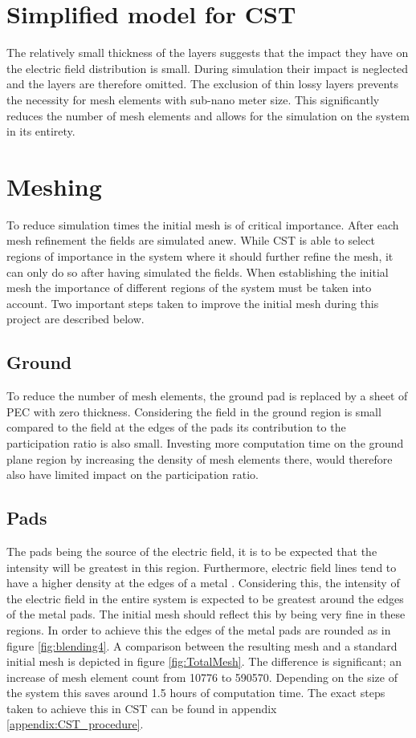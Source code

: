 \section{Simplified model for CST}
The relatively small thickness of the layers suggests that the impact they have on the electric field distribution is small. During simulation their impact is neglected and the layers are therefore omitted. %
The exclusion of thin lossy layers prevents the necessity for mesh elements with sub-nano meter size. This significantly reduces the number of mesh elements and allows for the simulation on the system in its entirety.

\section{Meshing}
To reduce simulation times the initial mesh is of critical importance. After each mesh refinement the fields are simulated anew. While CST is able to select regions of importance in the system where it should further refine the mesh, it can only do so after having simulated the fields. When establishing the initial mesh the importance of different regions of the system must be taken into account. Two  important steps taken to improve the initial mesh during this project are described below.   


\subsection{Ground}
To reduce the number of mesh elements, the ground pad is replaced by a sheet of PEC with zero thickness. Considering the field in the ground region is small compared to the field at the edges of the pads its contribution to the participation ratio is also small. Investing more computation time on the ground plane region by increasing the density of mesh elements there, would therefore also have limited impact on the participation ratio.
\subsection{Pads}
The pads being the source of the electric field, it is to be expected that the intensity will be greatest in this region. Furthermore, electric field lines tend to have a higher density at the edges of a metal . Considering this, the intensity of the electric field in the entire system is expected to be greatest around the edges of the metal pads. The initial mesh should reflect this by being very fine in these regions. In order to achieve this the edges of the metal pads are rounded as in figure \ref{fig:blending4}. A comparison between the resulting mesh and a standard initial mesh is depicted in figure \ref{fig:TotalMesh}. The difference is significant; an increase of mesh element count from 10776 to 590570. Depending on the size of the system this saves around 1.5 hours of computation time. The exact steps taken to achieve this in CST can be found in appendix \ref{appendix:CST_procedure}. 

